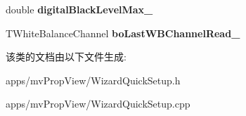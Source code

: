 \begin{DoxyCompactItemize}
\item 
\hypertarget{class_wizard_quick_setup_a798dc42bf3f82457e283b5ed69f68a9e}{double {\bfseries digital\+Black\+Level\+Max\+\_\+}}\label{class_wizard_quick_setup_a798dc42bf3f82457e283b5ed69f68a9e}

\item 
\hypertarget{class_wizard_quick_setup_ab0fe202c48e8cbf2f193574843abcd83}{T\+White\+Balance\+Channel {\bfseries bo\+Last\+W\+B\+Channel\+Read\+\_\+}}\label{class_wizard_quick_setup_ab0fe202c48e8cbf2f193574843abcd83}

\end{DoxyCompactItemize}


该类的文档由以下文件生成\+:\begin{DoxyCompactItemize}
\item 
apps/mv\+Prop\+View/Wizard\+Quick\+Setup.\+h\item 
apps/mv\+Prop\+View/Wizard\+Quick\+Setup.\+cpp\end{DoxyCompactItemize}
